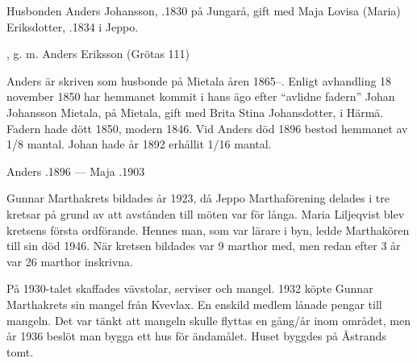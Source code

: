 %
Husbonden Anders Johansson,  .1830 på Jungarå, gift med Maja Lovisa (Maria) Eriksdotter, .1834 i Jeppo.
\begin{jhchildren}
  \item {}
  \item {}
  \item {}
  \item {}
  \item {}
  \item {}, g. m. Anders Eriksson (Grötas 111)
  \item {}
\end{jhchildren}

Anders är skriven som husbonde på Mietala åren 1865--. Enligt avhandling 18 november 1850 har hemmanet kommit i hans ägo efter	``avlidne fadern'' Johan Johansson Mietala,  på Mietala, gift med Brita Stina Johansdotter,  i Härmä. Fadern hade dött 1850, modern 1846.	Vid Anders död 1896 bestod hemmanet av 1/8 mantal. Johan hade år 1892 erhållit 1/16 mantal.

Anders .1896  ---  Maja .1903



%

%
Gunnar Marthakrets bildades år 1923, då Jeppo Marthaförening delades i tre kretsar på grund av att avstånden till möten var för långa. Maria Liljeqvist blev kretsens första ordförande. Hennes man, som var lärare i byn, ledde Marthakören till sin död 1946. När kretsen bildades var 9 marthor med, men redan efter 3 år var 26 marthor inskrivna.

På 1930-talet skaffades vävstolar, serviser och mangel. 1932 köpte Gunnar Marthakrets sin mangel från Kvevlax. En enskild medlem lånade pengar till mangeln. Det var tänkt att mangeln skulle flyttas en gång/år inom området, men år 1936 beslöt man bygga ett hus för ändamålet. Huset byggdes på Åstrands tomt.

